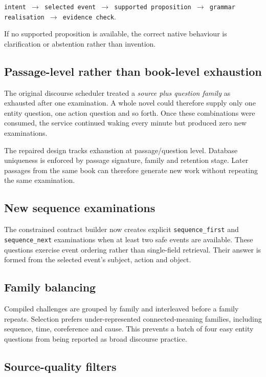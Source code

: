 \documentclass[11pt,a4paper]{article}
\begin{document}
\begin{center}
\texttt{intent $\rightarrow$ selected event $\rightarrow$ supported proposition
$\rightarrow$ grammar realisation $\rightarrow$ evidence check}.
\end{center}

If no supported proposition is available, the correct native behaviour is clarification or
abstention rather than invention.

\subsection{Passage-level rather than book-level exhaustion}

The original discourse scheduler treated a \emph{source plus question family} as exhausted after
one examination. A whole novel could therefore supply only one entity question, one action
question and so forth. Once these combinations were consumed, the service continued waking every
minute but produced zero new examinations.

The repaired design tracks exhaustion at passage/question level. Database uniqueness is enforced
by passage signature, family and retention stage. Later passages from the same book can therefore
generate new work without repeating the same examination.

\subsection{New sequence examinations}

The constrained contract builder now creates explicit \texttt{sequence\_first} and
\texttt{sequence\_next} examinations when at least two safe events are available. These questions
exercise event ordering rather than single-field retrieval. Their answer is formed from the
selected event's subject, action and object.

\subsection{Family balancing}

Compiled challenges are grouped by family and interleaved before a family repeats. Selection
prefers under-represented connected-meaning families, including sequence, time, coreference and
cause. This prevents a batch of four easy entity questions from being reported as broad discourse
practice.

\subsection{Source-quality filters}
\end{document}

